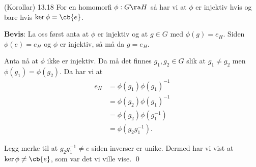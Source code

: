 \begin{theorem*}{(Korollar) 13.18}{}
	For en homomorfi $\phi:G\ra H$ så har vi at $\phi$ er injektiv hvis og bare hvis
	$\ker\phi=\cb{e}$.
\end{theorem*}

\textbf{Bevis}: La oss først anta at $\phi$ er injektiv og at $g\in G$ med $\phi(g)=e_H$. Siden
$\phi(e)=e_H$ og $\phi$ er injektiv, så må da $g=e_H$.

Anta nå at $\phi$ ikke er injektiv. Da må det finnes $g_1, g_2\in G$ slik at $g_1\neq g_2$
men $\phi(g_1)=\phi(g_2)$. Da har vi at
\begin{align}
	e_H & =\phi(g_1)\phi(g_1)^{-1} \\
	    & =\phi(g_2)\phi(g_1)^{-1} \\
      &= \phi(g_2)\phi(g_1^{-1}) \\
      &= \phi(g_2g_1^{-1}).
\end{align}

Legg merke til at $g_2g_1^{-1}\neq e$ siden inverser er unike. Dermed har vi vist at 
$\ker\phi\neq \cb{e}$, som var det vi ville vise. \qed
